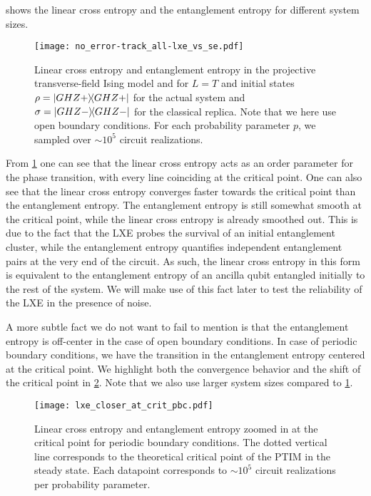  shows the linear cross entropy and the
entanglement entropy for different system sizes.
\begin{figure}[h]
  \centering
  \texttt{[image: no\_error-track\_all-lxe\_vs\_se.pdf]}
  \caption{Linear cross entropy and entanglement entropy in the projective
  transverse-field Ising model and for $L=T$ and initial states $\rho =
  \dyad{GHZ+}$ for the actual system and $\sigma=\dyad{GHZ-}$ for the classical
  replica. Note that we here use open boundary conditions. For each probability
  parameter $p$, we sampled over $\sim 10^5$ circuit realizations.}
  \label{fig:lxe-vs-se-default}
\end{figure}

From \cref{fig:lxe-vs-se-default} one can see that the linear cross entropy
acts as an order parameter for the phase transition, with every line coinciding
at the critical point. One can also see that the linear cross entropy converges
faster towards the critical point than the entanglement entropy. The
entanglement entropy is still somewhat smooth at the critical point, while the
linear cross entropy is already smoothed out. This is due to the fact that the
LXE probes the survival of an initial entanglement cluster, while the
entanglement entropy quantifies independent entanglement pairs at the very end
of the circuit. As such, the linear cross entropy in this form is equivalent to
the entanglement entropy of an ancilla qubit entangled initially to the rest of
the system. We will make use of this fact later to test the reliability of the
LXE in the presence of noise.

A more subtle fact we do not want to fail to mention is that the entanglement
entropy is off-center in the case of open boundary conditions. In case of
periodic boundary conditions, we have the transition in the entanglement
entropy centered at the critical point.
We highlight both the convergence behavior and the shift of the critical point
in \cref{fig:lxe-closer-at-crit}. Note that we also use larger system sizes
compared to \cref{fig:lxe-vs-se-default}.

\begin{figure}[h]
  \centering
  \texttt{[image: lxe\_closer\_at\_crit\_pbc.pdf]}
  \caption{Linear cross entropy and entanglement entropy zoomed in at the
  critical point for periodic boundary conditions. The dotted vertical line
corresponds to the theoretical critical point of the PTIM in the steady state.
Each datapoint corresponds to $\sim 10^5$ circuit realizations per probability
parameter.}
  \label{fig:lxe-closer-at-crit}
\end{figure}

